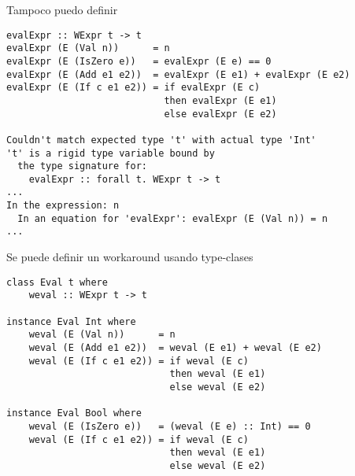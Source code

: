 \documentclass{article}
\begin{document}
Tampoco puedo definir

\begin{lstlisting}
evalExpr :: WExpr t -> t
evalExpr (E (Val n))      = n
evalExpr (E (IsZero e))   = evalExpr (E e) == 0
evalExpr (E (Add e1 e2))  = evalExpr (E e1) + evalExpr (E e2)
evalExpr (E (If c e1 e2)) = if evalExpr (E c)
                            then evalExpr (E e1)
                            else evalExpr (E e2)
                            
Couldn't match expected type 't' with actual type 'Int'
't' is a rigid type variable bound by
  the type signature for:
    evalExpr :: forall t. WExpr t -> t
...
In the expression: n
  In an equation for 'evalExpr': evalExpr (E (Val n)) = n
...
\end{lstlisting}

Se puede definir un workaround usando type-clases

\begin{lstlisting}
class Eval t where
    weval :: WExpr t -> t

instance Eval Int where
    weval (E (Val n))      = n
    weval (E (Add e1 e2))  = weval (E e1) + weval (E e2)
    weval (E (If c e1 e2)) = if weval (E c) 
                             then weval (E e1) 
                             else weval (E e2)

instance Eval Bool where
    weval (E (IsZero e))   = (weval (E e) :: Int) == 0
    weval (E (If c e1 e2)) = if weval (E c) 
                             then weval (E e1)
                             else weval (E e2)
\end{lstlisting}
\end{document}
